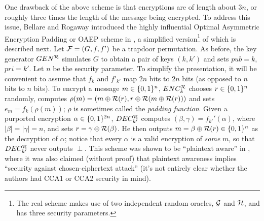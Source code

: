 One drawback of the above scheme is that encryptions are of length about $3n$,
or roughly three times the length of the message being encrypted. To address
this issue, Bellare and Rogaway introduced the highly influential Optimal
Asymmetric Encryption Padding or OAEP scheme
in \cite{bellare:oaep}, a simplified version\footnote{The real scheme makes
use of two independent random oracles, $\mathcal{G}$ and $\mathcal{H}$, and has three
security parameters.} of which is described next.  Let $\mathcal{F} = (G,f,f')$ be a
trapdoor permutation. As before, the key generator $GEN^{\mathcal{R}}$ simulates $G$
to obtain a pair of keys $(k,k')$ and sets $pub = k$, $pri = k'$. Let $n$ be
the security parameter. To simplify the presentation, it will be convenient to
assume that $f_k$ and $f'_{k'}$ map $2n$ bits to $2n$ bits (as opposed to $n$
bits to $n$ bits). To encrypt a message $m \in \{0,1\}^{n}$, $ENC^{\mathcal{R}}_k$
chooses $r \in \{0,1\}^{n}$ randomly, computes $\rho(m) = (m \oplus \mathcal{R}(r), r
\oplus \mathcal{R}(m \oplus \mathcal{R}(r)))$ and sets $e_m = f_k(\rho(m))$; $\rho$ is
sometimes called the {\it padding function}. Given a purported encryption
$\alpha \in \{0,1\}^{2n}$, $DEC^{\mathcal{R}}_{k'}$ computes $(\beta,\gamma) =
f_{k'}'(\alpha)$, where $|\beta| = |\gamma| = n$, and sets $r = \gamma \oplus
\mathcal{R}(\beta)$. He then outputs $m = \beta \oplus \mathcal{R}(r) \in \{0,1\}^{n}$ as the
decryption of $\alpha$; notice that every $\alpha$ is a valid encryption of
{\it some} $m$, so that $DEC_{k'}^{\mathcal{R}}$ never outputs $\perp$. This scheme
was shown to be ``plaintext aware'' in \cite{bellare:oaep}, where it was also
claimed (without proof) that plaintext awareness implies ``security against
chosen-ciphertext attack'' (it's not entirely clear whether the authors had
CCA1 or CCA2 security in mind).

